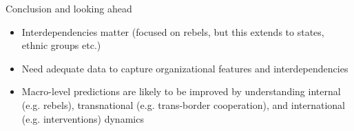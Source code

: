 \documentclass{beamer}
\begin{document}
\begin{frame}{Conclusion and looking ahead}
\begin{itemize}
\item Interdependencies matter (focused on rebels, but this extends to states, ethnic groups etc.)
\item Need adequate data to capture organizational features and interdependencies 
\item Macro-level predictions are likely to be improved by understanding internal (e.g. rebels), transnational (e.g. trans-border cooperation), and international (e.g. interventions) dynamics
\end{itemize}
\end{frame}
\end{document}
